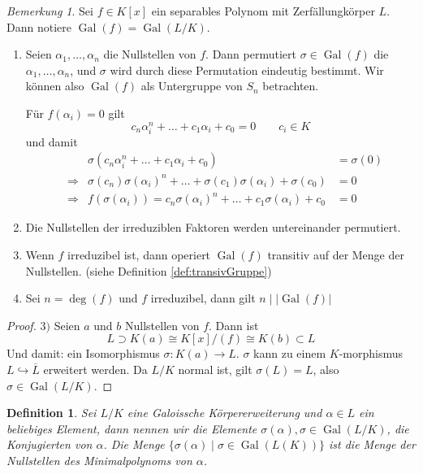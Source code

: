 \documentclass[a4paper,12pt,numbers=noenddot,parskip=full]{scrartcl}
\newcommand{\abs}[1]{{\left| #1 \right|}}
\newcommand{\heading}{\underline}
\DeclareMathOperator{\Gal}{Gal}
\theoremstyle{dotless}
\newtheorem{definition}[theorem]{Definition}
\theoremstyle{remark}
\newtheorem*{remark}{Bemerkung}
\begin{document}
	\begin{remark}
		Sei $f \in K[x]$ ein separables Polynom mit Zerfällungkörper $L$. Dann notiere $\Gal(f) = \Gal(L/K)$.
		\begin{enumerate}
			\item Seien $\alpha_1, \dots, \alpha_n$ die Nullstellen von $f$. Dann permutiert $\sigma \in \Gal(f)$ die $\alpha_1, \dots, \alpha_n$, und $\sigma$ wird durch diese Permutation eindeutig bestimmt. Wir können also $\Gal(f)$ als Untergruppe von $S_n$ betrachten.
			
			Für $f(\alpha_i) = 0$ gilt
			\begin{equation*}
				c_n \alpha_i^n + \dots + c_1 \alpha_i + c_0 = 0 \qquad c_i \in K
			\end{equation*}
			und damit
			\begin{align*}
				&&\sigma(c_n \alpha_i^n + \dots + c_1 \alpha_i + c_0) &= \sigma(0) \\
				&\Rightarrow& \sigma(c_n) \sigma(\alpha_i)^n + \dots + \sigma(c_1) \sigma(\alpha_i) + \sigma(c_0) &= 0 \\
				&\Rightarrow& f(\sigma(\alpha_i)) =  c_n \sigma(\alpha_i)^n + \dots + c_1 \sigma(\alpha_i) + c_0 &= 0
			\end{align*}
			\item Die Nullstellen der irreduziblen Faktoren werden untereinander permutiert.
			\item Wenn $f$ irreduzibel ist, dann operiert $\Gal(f)$ transitiv auf der Menge der Nullstellen. (siehe Definition \ref{def:transivGruppe})
			\item Sei $n = \deg(f)$ und $f$ irreduzibel, dann gilt $n \mid \abs{\Gal(f)}$
		\end{enumerate}
	\end{remark}

	\begin{proof}
		\heading{$3)$} Seien $a$ und $b$ Nullstellen von $f$. Dann ist \begin{equation*}
			L \supset K(a) \cong K[x]/(f) \cong K(b) \subset L
		\end{equation*}
		Und damit: ein Isomorphismus $\sigma: K(a) \to L$. $\sigma$ kann zu einem $K$-morphismus $L \hookrightarrow \overline{L}$ erweitert werden. Da $L/K$ normal ist, gilt $\sigma(L) = L$, also $\sigma \in \Gal(L/K)$.
	\end{proof}

	\begin{definition}
		Sei $L/K$ eine Galoissche Körpererweiterung und $\alpha \in L$ ein beliebiges Element, dann nennen wir die Elemente $\sigma(\alpha), \sigma \in \Gal(L/K)$, die Konjugierten von $\alpha$. Die Menge $\{ \sigma(\alpha) \mid \sigma \in \Gal(L(K)) \}$ ist die Menge der Nullstellen des Minimalpolynoms von $\alpha$.
	\end{definition}
\end{document}
